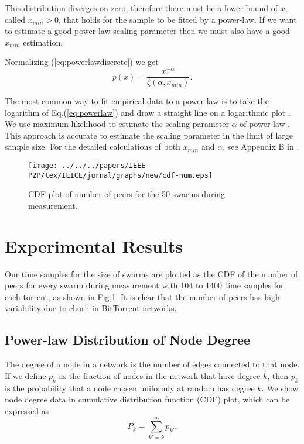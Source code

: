 This distribution diverges on zero, therefore there must be a lower bound of $x$, called $x_{min} > 0$, that holds for the sample to be fitted by a power-law. 
If we want to estimate a good power-law scaling parameter then we must also have a good $x_{min}$ estimation. 

Normalizing (\ref{eq:powerlawdiscrete})  we get
\begin{equation}
p(x)=\frac{x^{- \alpha}}{\zeta(\alpha,x_{min})}.
\end{equation} 

The most common way to fit empirical data to a power-law is to take the logarithm of Eq.(\ref{eq:powerlaw}) and draw a straight line on a logarithmic plot \cite{mitzenmacher2004brief}.  
We use maximum likelihood to estimate the scaling parameter $\alpha$ of power-law \cite{clauset2009power}.  
This approach is accurate to estimate the scaling parameter in the limit of large sample size. 
For the detailed calculations of both $x_{min}$ and $\alpha$, see Appendix B in \cite{clauset2009power}.

\begin{figure}[!t]
\begin{center}
\texttt{[image: ../../../papers/IEEE-P2P/tex/IEICE/jurnal/graphs/new/cdf-num.eps]}
\end{center}
\caption{CDF plot of number of peers for the 50 swarms during measurement.}
\label{fig:num_peers}
\end{figure}

\section{Experimental Results}\label{result}
Our time samples for the size of swarms are plotted as the CDF of the number of peers for every swarm during measurement with 104 to 1400 time samples for each torrent, as shown in Fig.\ref{fig:num_peers}. 
It is clear that the number of peers has high variability due to churn in BitTorrent networks. 

\subsection{Power-law Distribution of Node Degree}
The degree of a node in a network is the number of edges connected to that node. 
If we define $p_k$ as the  fraction of nodes in the network that have degree $k$, then $p_k$ is the probability that a node chosen uniformly at random has degree $k$. 
We show node degree data in cumulative distribution function (CDF) plot, which can be expressed as
\begin{equation}
P_k = \sum_{k'=k}^{\infty} p_{k'}.
\end{equation}

